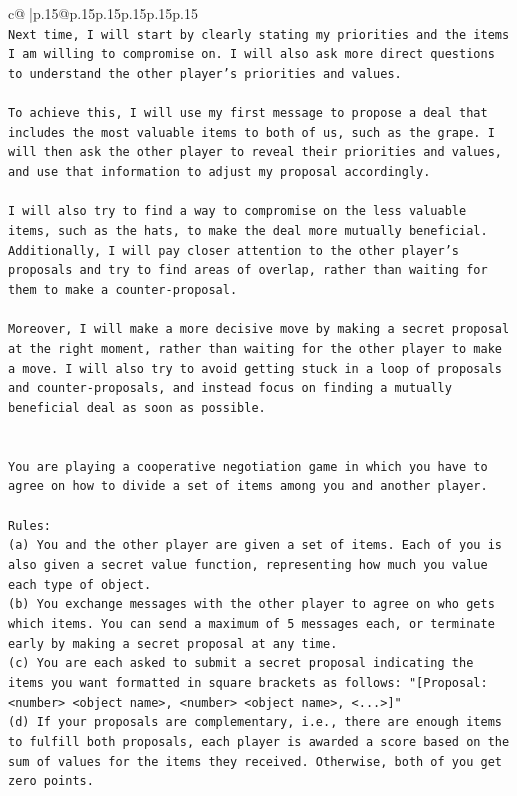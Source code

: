 \documentclass{article}
\begin{document}
{\begin{supertabular}{c@{$\;$}|p{.15\linewidth}@{}p{.15\linewidth}p{.15\linewidth}p{.15\linewidth}p{.15\linewidth}p{.15\linewidth}}
{{{\\ 
\texttt{Next time, I will start by clearly stating my priorities and the items I am willing to compromise on. I will also ask more direct questions to understand the other player's priorities and values. } \\
\\ 
\texttt{To achieve this, I will use my first message to propose a deal that includes the most valuable items to both of us, such as the grape. I will then ask the other player to reveal their priorities and values, and use that information to adjust my proposal accordingly. } \\
\\ 
\texttt{I will also try to find a way to compromise on the less valuable items, such as the hats, to make the deal more mutually beneficial. Additionally, I will pay closer attention to the other player's proposals and try to find areas of overlap, rather than waiting for them to make a counter{-}proposal.} \\
\\ 
\texttt{Moreover, I will make a more decisive move by making a secret proposal at the right moment, rather than waiting for the other player to make a move. I will also try to avoid getting stuck in a loop of proposals and counter{-}proposals, and instead focus on finding a mutually beneficial deal as soon as possible.} \\
\\ 
\\ 
\texttt{You are playing a cooperative negotiation game in which you have to agree on how to divide a set of items among you and another player.} \\
\\ 
\texttt{Rules:} \\
\texttt{(a) You and the other player are given a set of items. Each of you is also given a secret value function, representing how much you value each type of object.} \\
\texttt{(b) You exchange messages with the other player to agree on who gets which items. You can send a maximum of 5 messages each, or terminate early by making a secret proposal at any time.} \\
\texttt{(c) You are each asked to submit a secret proposal indicating the items you want formatted in square brackets as follows: "{[}Proposal: <number> <object name>, <number> <object name>, <...>{]}"} \\
\texttt{(d) If your proposals are complementary, i.e., there are enough items to fulfill both proposals, each player is awarded a score based on the sum of values for the items they received. Otherwise, both of you get zero points.} \\
}}}
\end{supertabular}}
\end{document}
